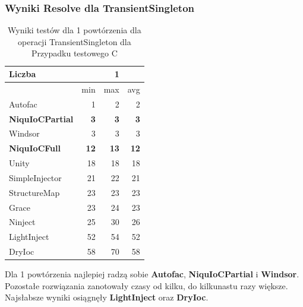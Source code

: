 \documentclass[12pt]{article}
\begin{document}
\subsubsection{Wyniki Resolve dla TransientSingleton}
\begin{table}[H]
\captionsetup{belowskip=0pt,aboveskip=0pt}
\begin{center}
\begin{small}
	\begin{tabular}{ | l | r r r | }
    		\hline
Liczba & & 1 & \\ \hline
 & min & max & avg \\ \hline
Autofac & 1 & 2 & 2 \\ \hline
\textbf{NiquIoCPartial} & \textbf{3} & \textbf{3} & \textbf{3} \\ \hline
Windsor & 3 & 3 & 3 \\ \hline
\textbf{NiquIoCFull} & \textbf{12} & \textbf{13} & \textbf{12} \\ \hline
Unity & 18 & 18 & 18 \\ \hline
SimpleInjector & 21 & 22 & 21 \\ \hline
StructureMap & 23 & 23 & 23 \\ \hline
Grace & 23 & 24 & 23 \\ \hline
Ninject & 25 & 30 & 26 \\ \hline
LightInject & 52 & 54 & 52 \\ \hline
DryIoc & 58 & 70 & 58 \\ \hline
  	\end{tabular}
\end{small}
\end{center}
\caption{Wyniki testów dla 1 powtórzenia dla operacji TransientSingleton dla Przypadku testowego C}
\label{TestCaseC_TransientSingleton1}
\end{table}
Dla 1 powtórzenia najlepiej radzą sobie \textbf{Autofac}, \textbf{NiquIoCPartial} i \textbf{Windsor}. Pozostałe rozwiązania zanotowały czasy od kilku, do kilkunastu razy większe. Najsłabsze wyniki osiągnęły \textbf{LightInject} oraz \textbf{DryIoc}.
\\ \\
\end{document}
